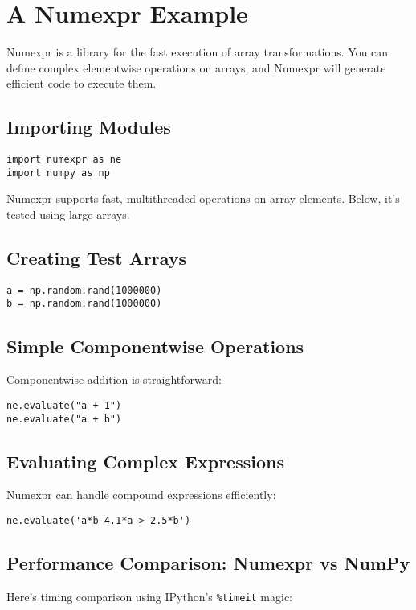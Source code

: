 \documentclass[11pt,a4paper]{book}
\begin{document}
\section{A Numexpr Example}

Numexpr is a library for the fast execution of array transformations. You can define complex elementwise operations on arrays, and Numexpr will generate efficient code to execute them.

\subsection*{Importing Modules}
\begin{lstlisting}
import numexpr as ne
import numpy as np
\end{lstlisting}

Numexpr supports fast, multithreaded operations on array elements. Below, it's tested using large arrays.

\subsection*{Creating Test Arrays}
\begin{lstlisting}
a = np.random.rand(1000000)
b = np.random.rand(1000000)
\end{lstlisting}

\subsection*{Simple Componentwise Operations}
Componentwise addition is straightforward:
\begin{lstlisting}
ne.evaluate("a + 1")
ne.evaluate("a + b")
\end{lstlisting}

\subsection*{Evaluating Complex Expressions}
Numexpr can handle compound expressions efficiently:
\begin{lstlisting}
ne.evaluate('a*b-4.1*a > 2.5*b')
\end{lstlisting}

\subsection*{Performance Comparison: Numexpr vs NumPy}
Here's timing comparison using IPython’s \verb|%timeit| magic:
\end{document}

